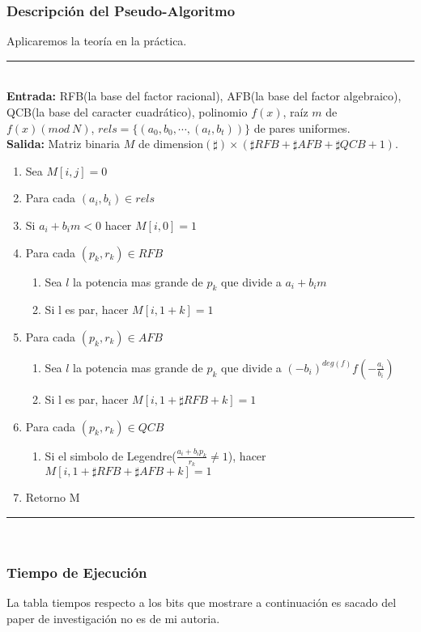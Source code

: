 \documentclass[11pt, conference]{IEEEtran}
\begin{document}
\subsubsection[Descripción del Pseudo-Algoritmo]{\textbf{Descripción del Pseudo-Algoritmo}}
Aplicaremos la teoría en la práctica.\\ 
\rule[0mm]{181mm}{0.1mm}\\
\textbf{Entrada:} RFB(la base del factor racional), AFB(la base del factor algebraico), QCB(la base del caracter cuadrático), polinomio $f(x)$, raíz $m$ de $f(x)(mod\ N)$, $rels=\{(a_0,b_0,\cdots,(a_t,b_t))\}$ de pares uniformes.\\
\textbf{Salida:} Matriz binaria $M$ de dimension$(\sharp)\times(\sharp RFB+\sharp AFB +\sharp QCB + 1)$.
\begin{enumerate}
	\item Sea $M[i, j]=0$
	\item Para cada $(a_i, b_i)\in rels$
	\item Si $a_i+b_im<0$ hacer $M[i,0]=1$
	\item Para cada $(p_k,r_k) \in RFB$
	\begin{enumerate}
		\item Sea $l$ la potencia mas grande de $p_k$ que divide a $a_i+b_im$
		\item Si l es par, hacer $M[i,1+k]=1$
	\end{enumerate}
	\item Para cada $(p_k,r_k)\in AFB$
	\begin{enumerate}
		\item Sea $l$ la potencia mas grande de $p_k$ que divide a $(-b_i)^{deg(f)}f(-\frac{a_i}{b_i})$
		\item Si l es par, hacer $M[i,1+\sharp RFB+k]=1$
	\end{enumerate}
	\item Para cada $(p_k,r_k)\in QCB$
	\begin{enumerate}
		\item Si el simbolo de Legendre($\frac{a_i+b_ip_k}{r_k}\neq1$), hacer $M[i,1+\sharp RFB+\sharp AFB + k] = 1$
	\end{enumerate}
	\item Retorno M
\end{enumerate}
\rule[3mm]{181mm}{0.1mm}

\

\subsubsection[Tiempo de Ejecución]{\textbf{Tiempo de Ejecución}}
La tabla tiempos respecto a los bits que mostrare a continuación es sacado del paper de investigación no es de mi autoria.
\cite{a}
\end{document}

